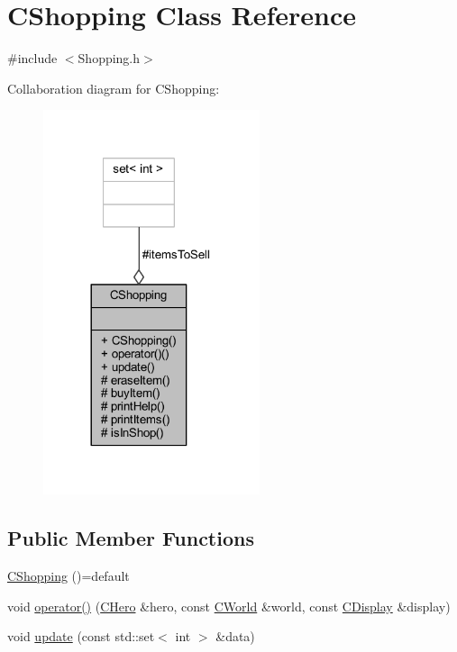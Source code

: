 \hypertarget{class_c_shopping}{}\section{C\+Shopping Class Reference}
\label{class_c_shopping}


{\ttfamily \#include $<$Shopping.\+h$>$}



Collaboration diagram for C\+Shopping\+:\nopagebreak
\begin{figure}[H]
\begin{center}
\leavevmode
\includegraphics[width=180pt]{class_c_shopping__coll__graph}
\end{center}
\end{figure}
\subsection*{Public Member Functions}
\begin{DoxyCompactItemize}
\item 
\mbox{\hyperlink{class_c_shopping_a3d9bc582b9961e02efc9dc22c6da2ced}{C\+Shopping}} ()=default
\item 
void \mbox{\hyperlink{class_c_shopping_ab72dff2e94f897bd5c3f1ef660e65afb}{operator()}} (\mbox{\hyperlink{class_c_hero}{C\+Hero}} \&hero, const \mbox{\hyperlink{class_c_world}{C\+World}} \&world, const \mbox{\hyperlink{class_c_display}{C\+Display}} \&display)
\item 
void \mbox{\hyperlink{class_c_shopping_aa232d999181d07bfd6ec0ec5c645f51b}{update}} (const std\+::set$<$ int $>$ \&data)
\end{DoxyCompactItemize}
